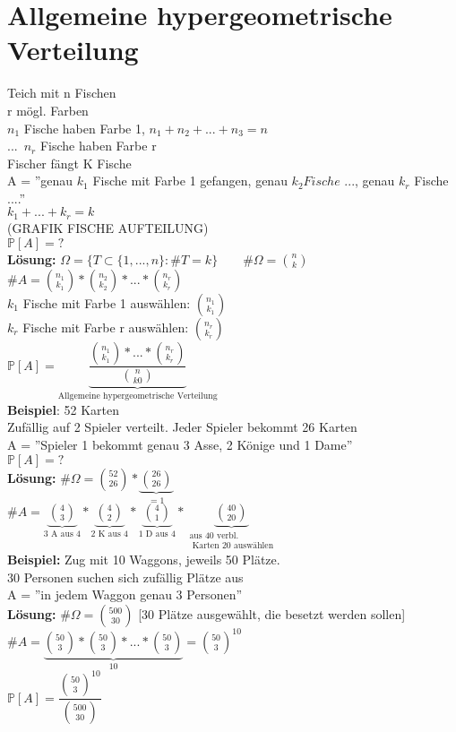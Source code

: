 \section{Allgemeine hypergeometrische Verteilung}
Teich mit n Fischen\\
r mögl. Farben\\
$n_1$ Fische haben Farbe 1, \hspace{1cm} $n_1 + n_2 +...+n_3 = n$\\
...\
$n_r$ Fische haben Farbe r\medskip\\
Fischer fängt K Fische\\
 A = ''genau $k_1$ Fische mit Farbe 1 gefangen, genau $k_2 Fische $ ..., genau $k_r$ Fische ....''\\
 $k_1 + ... + k_r = k$\\
 (GRAFIK FISCHE AUFTEILUNG)\medskip\\
 $\mathds{P}[A] = ?$\medskip\\
 \textbf{Lösung:} $\Omega = \{ T \subset \{1,...,n\}:\#T=k\} \qquad \#\Omega = \binom{n}{k}$\\
 $\#A = \binom{n_1}{k_1} * \binom{n_2}{k_2}*...*\binom{n_r}{k_r}$\medskip\\
 $k_1$ Fische mit Farbe 1 auswählen: $\binom{n_1}{k_1}$\\
 $k_r$ Fische mit Farbe r auswählen: $\binom{n_r}{k_r}$\medskip\\
 $\mathds{P}[A] = \underbrace{\dfrac{\binom{n_1}{k_1}*...*\binom{n_r}{k_r}}{\binom{n}{k0}}}_\text{Allgemeine hypergeometrische Verteilung}$\medskip\\
 \textbf{Beispiel}: 52 Karten\\
 Zufällig auf 2 Spieler verteilt. Jeder Spieler bekommt 26 Karten\medskip\\
 A = ''Spieler 1 bekommt genau 3 Asse, 2 Könige und 1 Dame''\\
 $\mathds{P}[A] = ?$\medskip\\
 \textbf{Lösung:} $\#\Omega = \binom{52}{26} * \underbrace{\binom{26}{26}}_{=1}$\medskip\\
 $\#A=\underbrace{\binom{4}{3}}_\text{3 A aus 4}*\underbrace{\binom{4}{2}}_\text{2 K aus 4}*\underbrace{\binom{4}{1}}_\text{1 D aus 4}*\underbrace{\binom{40}{20}}_{\substack{\text{aus 40 verbl.}\\\text{ Karten 20 auswählen}}}$\medskip\\
 \textbf{Beispiel:} Zug mit 10 Waggons, jeweils 50 Plätze.\\
 30 Personen suchen sich zufällig Plätze aus\smallskip\\
 A = ''in jedem Waggon genau 3 Personen''\medskip\\
 \textbf{Lösung:} $\#\Omega = \binom{500}{30}$ [30 Plätze ausgewählt, die besetzt werden sollen]\medskip\\
 $\#A = \underbrace{\binom{50}{3}*\binom{50}{3}*...*\binom{50}{3}}_10 = \binom{50}{3}^{10}$\smallskip\\
 $\mathds{P}[A] = \dfrac{\binom{50}{3}^{10}}{\binom{500}{30}}$
